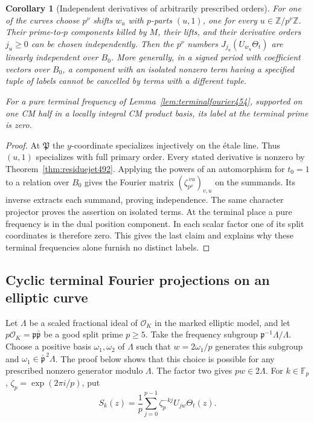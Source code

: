 \documentclass[a4paper,11pt]{article}
\newtheorem{corollary}[proposition]{Corollary}
\theoremstyle{definition}
\theoremstyle{remark}
\numberwithin{equation}{section}
\begin{document}
\begin{corollary}[Independent derivatives of arbitrarily prescribed orders]\leavevmode
\label{cor:indepder494}
For one of the curves choose \(p^\nu\) shifts \(w_u\) with
\(p\)-parts \((u,1)\), one for every \(u\in\mathbb Z/p^\nu\mathbb Z\).
Their prime-to-\(p\) components killed by \(M\), their lifts, and
their derivative orders \(j_u\ge0\) can be chosen independently.
Then the \(p^\nu\) numbers \(J_{j_u}(U_{w_u}\Theta_t)\) are
linearly independent over \(B_0\). More generally, in a signed
period with coefficient vectors over \(B_0\), a component with
an isolated nonzero term having a specified tuple of labels
cannot be cancelled by terms with a different tuple.

For a pure terminal frequency of
Lemma~\ref{lem:terminalfourier454}, supported on one CM half in
a locally integral CM product basis, its label at the terminal
prime is zero.
\end{corollary}
\begin{proof}
At \(\mathfrak P\) the \(y\)-coordinate specializes injectively
on the \'etale line. Thus \((u,1)\) specializes with full primary
order. Every stated derivative is nonzero by
Theorem~\ref{thm:residuejet492}. Applying the powers of an
automorphism for \(t_0=1\) to a relation over \(B_0\) gives the
Fourier matrix \((\zeta_{p^\nu}^{\,vu})_{v,u}\) on the summands.
Its inverse extracts each summand, proving independence. The
same character projector proves the assertion on isolated terms.
At the terminal place a pure frequency is in the dual position
component. In each scalar factor one of its split coordinates
is therefore zero. This gives the last claim and explains why
these terminal frequencies alone furnish no distinct labels.
\end{proof}


\subsection{Cyclic terminal Fourier projections on an elliptic curve}
\label{sec:cyclicneighbor495}

Let \(\Lambda\) be a scaled fractional ideal of \(\mathcal O_K\) in
the marked elliptic model, and let \(p\mathcal O_K=\mathfrak p
\bar{\mathfrak p}\) be a good split prime \(p\ge5\). Take the
frequency subgroup \(\mathfrak p^{-1}\Lambda/\Lambda\).
Choose a positive basis \(\omega_1,\omega_2\) of \(\Lambda\)
such that \(w=2\omega_1/p\) generates this subgroup and
\(\omega_1\in\bar{\mathfrak p}^{\,2}\Lambda\).
The proof below shows that this choice is possible for any
prescribed nonzero generator modulo \(\Lambda\).
The factor two gives \(pw\in2\Lambda\). For
\(k\in\mathbb F_p\), \(\zeta_p=\exp(2\pi i/p)\), put
\[
 S_k(z)=\frac1p\sum_{j=0}^{p-1}\zeta_p^{-kj}
                           U_{jw}\Theta_t(z).
\]
\end{document}
